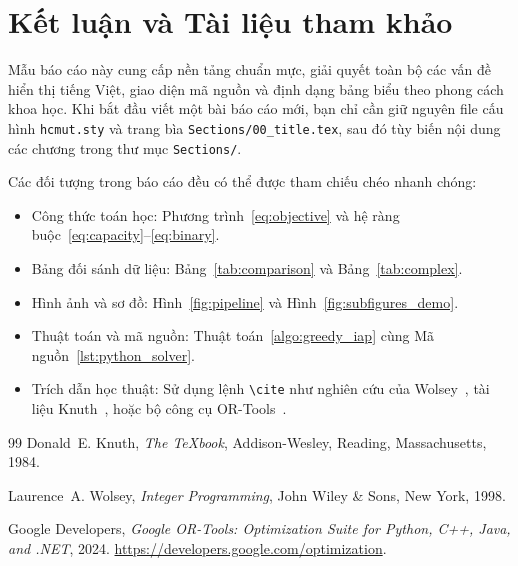 \section{Kết luận và Tài liệu tham khảo}
\label{sec:conclusion}

Mẫu báo cáo này cung cấp nền tảng chuẩn mực, giải quyết toàn bộ các vấn đề hiển thị tiếng Việt, giao diện mã nguồn và định dạng bảng biểu theo phong cách khoa học. Khi bắt đầu viết một bài báo cáo mới, bạn chỉ cần giữ nguyên file cấu hình \texttt{hcmut.sty} và trang bìa \texttt{Sections/00\_title.tex}, sau đó tùy biến nội dung các chương trong thư mục \texttt{Sections/}.

Các đối tượng trong báo cáo đều có thể được tham chiếu chéo nhanh chóng:
\begin{itemize}
    \item Công thức toán học: Phương trình~\eqref{eq:objective} và hệ ràng buộc~\eqref{eq:capacity}--\eqref{eq:binary}.
    \item Bảng đối sánh dữ liệu: Bảng~\ref{tab:comparison} và Bảng~\ref{tab:complex}.
    \item Hình ảnh và sơ đồ: Hình~\ref{fig:pipeline} và Hình~\ref{fig:subfigures_demo}.
    \item Thuật toán và mã nguồn: Thuật toán~\ref{algo:greedy_iap} cùng Mã nguồn~\ref{lst:python_solver}.
    \item Trích dẫn học thuật: Sử dụng lệnh \texttt{\textbackslash cite} như nghiên cứu của Wolsey~\cite{wolsey1999integer}, tài liệu Knuth~\cite{knuth1984texbook}, hoặc bộ công cụ OR-Tools~\cite{ortools}.
\end{itemize}

\begin{thebibliography}{99}
Donald~E. Knuth,
\textit{The \TeX book},
Addison-Wesley, Reading, Massachusetts, 1984.

Laurence~A. Wolsey,
\textit{Integer Programming},
John Wiley \& Sons, New York, 1998.

Google Developers,
\textit{Google OR-Tools: Optimization Suite for Python, C++, Java, and .NET},
2024. \url{https://developers.google.com/optimization}.
\end{thebibliography}
